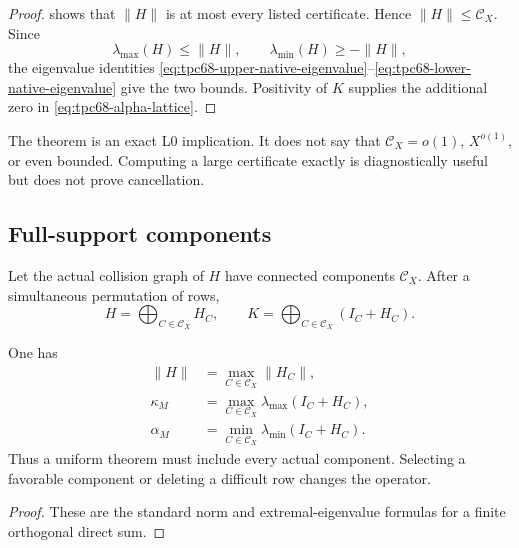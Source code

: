 \begin{proof}
shows that \(\|H\|\) is at most every listed certificate.  Hence
\(\|H\|\le\mathcal C_X\).  Since
\[
 \lambda_{\max}(H)\le\|H\|,
 \qquad
 \lambda_{\min}(H)\ge-\|H\|,
\]
the eigenvalue identities
\eqref{eq:tpc68-upper-native-eigenvalue}--\eqref{eq:tpc68-lower-native-eigenvalue}
give the two bounds.  Positivity of \(K\) supplies the additional zero in
\eqref{eq:tpc68-alpha-lattice}.
\end{proof}

\begin{remark}
\label{rem:tpc68-certificate-not-saving}
The theorem is an exact L0 implication.  It does not say that
\(\mathcal C_X=o(1)\), \(X^{o(1)}\), or even bounded.  Computing a large
certificate exactly is diagnostically useful but does not prove
cancellation.
\end{remark}

\subsection{Full-support components}

Let the actual collision graph of \(H\) have connected components
\(\mathscr C_X\).  After a simultaneous permutation of rows,
\[
 H=\bigoplus_{C\in\mathscr C_X}H_C,
 \qquad
 K=\bigoplus_{C\in\mathscr C_X}(I_C+H_C).
\]

\begin{proposition}
\label{prop:tpc68-worst-component}
One has
\begin{align}
 \|H\|&=\max_{C\in\mathscr C_X}\|H_C\|,
 \label{eq:tpc68-component-norm}\\
 \kappa_M&=\max_{C\in\mathscr C_X}
 \lambda_{\max}(I_C+H_C),
 \label{eq:tpc68-component-upper}\\
 \alpha_M&=\min_{C\in\mathscr C_X}
 \lambda_{\min}(I_C+H_C).
 \label{eq:tpc68-component-lower}
\end{align}
Thus a uniform theorem must include every actual component.  Selecting a
favorable component or deleting a difficult row changes the operator.
\end{proposition}

\begin{proof}
These are the standard norm and extremal-eigenvalue formulas for a finite
orthogonal direct sum.
\end{proof}

